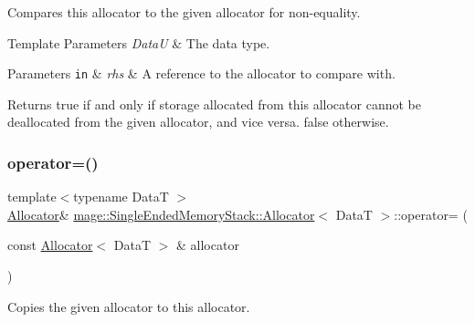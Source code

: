Compares this allocator to the given allocator for non-\/equality.


\begin{DoxyTemplParams}{Template Parameters}
{\em DataU} & The data type. \\
\hline
\end{DoxyTemplParams}

\begin{DoxyParams}[1]{Parameters}
\mbox{\tt in}  & {\em rhs} & A reference to the allocator to compare with. \\
\hline
\end{DoxyParams}
\begin{DoxyReturn}{Returns}
{\ttfamily true} if and only if storage allocated from this allocator cannot be deallocated from the given allocator, and vice versa. {\ttfamily false} otherwise. 
\end{DoxyReturn}
\hypertarget{classmage_1_1_single_ended_memory_stack_1_1_allocator_a22dbfaa5a0125fea5fdca730f07dac2c}{}\label{classmage_1_1_single_ended_memory_stack_1_1_allocator_a22dbfaa5a0125fea5fdca730f07dac2c} 
\subsubsection{\texorpdfstring{operator=()}{operator=()}\hspace{0.1cm}{\footnotesize\ttfamily [1/2]}}
{\footnotesize\ttfamily template$<$typename DataT $>$ \\
\hyperlink{classmage_1_1_single_ended_memory_stack_1_1_allocator}{Allocator}\& \hyperlink{classmage_1_1_single_ended_memory_stack_1_1_allocator}{mage\+::\+Single\+Ended\+Memory\+Stack\+::\+Allocator}$<$ DataT $>$\+::operator= (\begin{DoxyParamCaption}\item[{const \hyperlink{classmage_1_1_single_ended_memory_stack_1_1_allocator}{Allocator}$<$ DataT $>$ \&}]{allocator }\end{DoxyParamCaption})\hspace{0.3cm}{\ttfamily [delete]}}

Copies the given allocator to this allocator.


